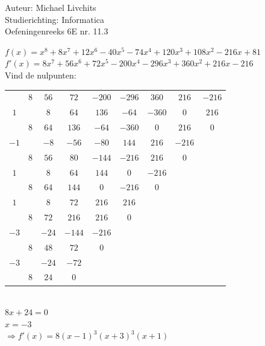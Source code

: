 \documentclass[a4paper]{article}
\begin{document}
  
\noindent \large Auteur: Michael Livchits \\
\noindent \large Studierichting: Informatica\\
\noindent \large Oefeningenreeks 6E nr. 11.3\\

\medskip

\normalsize

$f(x) = x^8+8x^7+12x^6-40x^5-74x^4+120x^3+108x^2-216x+81$\\

$f'(x) = 8x^7+56x^6+72x^5-200x^4-296x^3+360x^2+216x-216$\\

Vind de nulpunten:\\

\begin{tabular}{c|cccccccc}
    & $8$ 	& $56$   & $72$  & $-200$ & $-296$ & $360$ & $216$ & $-216$	 	\\
$1$ & 		& $8$ 	 & $64$  & $136$  & $-64$  & $-360$& $0$   & $216$  		\\ \hline
	& $8$   & $64$   & $136$ & $-64$  & $-360$  & $0$  &$216$ &\multicolumn{1}{|c}{$0$}  \\
$-1$ & 		& $-8$ 	 & $-56$  & $-80$ & $144$   & $216$& $-216$  		\\ \hline
	& $8$   & $56$   & $80$ & $-144$  & $-216$  & $216$  &\multicolumn{1}{|c}{$0$}  \\
$1$ & 		& $8$ 	 & $64$  & $144$  & $0$     & $-216$&  		\\ \hline
	& $8$   & $64$   & $144$ & $0$  & $-216$  &\multicolumn{1}{|c}{$0$}  \\
$1$ & 		& $8$ 	 & $72$  & $216$  & $216$     &  		\\ \hline
	& $8$   & $72$   & $216$ & $216$  &\multicolumn{1}{|c}{$0$}  \\
$-3$ & 		& $-24$  & $-144$  & $-216$  &  		\\ \hline
	& $8$   & $48$   & $72$ &\multicolumn{1}{|c}{$0$}  \\
$-3$ & 		& $-24$  & $-72$  &  		\\ \hline
	& $8$   & $24$   &\multicolumn{1}{|c}{$0$}  \\
\end{tabular}\\

$8x + 24 = 0$\\

$x = -3$\\

$\Rightarrow f'(x) = 8(x-1)^3(x+3)^3(x+1)$\\
\end{document}
